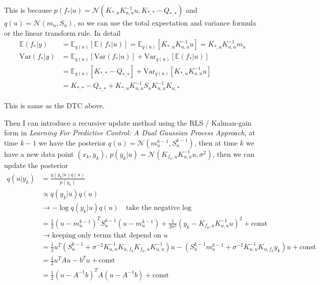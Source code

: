 \documentclass[10pt]{elegantbook}
\begin{document}
This is because $p(f_* | u) = \mathcal N (K_{*, u} K_{u, u}^{-1} u, K_{*, *} - Q_{*, *})$ and $q(u) = \mathcal N(m_u, S_u)$, so we can use the total expectation and variance formula or the linear transform rule.
In detail
\[
\begin{aligned}
    \mathbb E(f_* | y) &= \mathbb E_{q(u)} [\mathbb E(f_* | u)] = \mathbb E_{q(u)} [K_{*, u} K_{u, u}^{-1} u] = K_{*, u} K_{u, u}^{-1} m_u \\
    \text{Var}(f_* | y) &= \mathbb E_{q(u)} [\text{Var}(f_* | u)] + \text{Var}_{q(u)} [\mathbb E(f_* | u)] \\
    &= \mathbb E_{q(u)} [K_{*, *} - Q_{*, *}] + \text{Var}_{q(u)} [K_{*, u} K_{u, u}^{-1} u] \\
    &= K_{*, *} - Q_{*, *} + K_{*, u} K_{u, u}^{-1} S_u K_{u, u}^{-1} K_{u, *}
\end{aligned}
\]

This is same as the DTC above.

Then I can introduce a recursive update method using the RLS / Kalman-gain form in \textit{Learning For Predictive Control:
A Dual Gaussian Process Approach}, at time $k-1$ we have the posterior $q(u) = \mathcal N(m_u^{k-1}, S_u^{k-1})$, then at time $k$ we have a new data point $(x_k, y_k)$,
$p(y_k|u) = \mathcal N(K_{f_k, u} K_{u, u}^{-1} u, \sigma^2)$, then we can update the posterior
\begin{equation}
    \begin{aligned}
        q(u|y_k) &= \frac{q(y_k|u)q(u)}{p(y_k)} \\
        &\propto q(y_k|u)q(u) \\
        &\rightarrow - \log q(y_k|u)q(u) \quad \text{take the negative log} \\
        &= \frac{1}{2} (u - m_u^{k-1})^T S_u^{k-1} (u - m_u^{k-1}) + \frac{1}{2\sigma^2} (y_k - K_{f_k, u} K_{u, u}^{-1} u)^2 + \text{const} \\
        &\rightarrow \text{keeping only terms that depend on } u \\
        &= \frac{1}{2} u^T (S_u^{k-1} + \sigma^{-2} K_{u, u}^{-1} K_{u, f_k} K_{f_k, u} K_{u, u}^{-1}) u - (S_u^{k-1} m_u^{k-1} + \sigma^{-2} K_{u, u}^{-1} K_{u, f_k} y_k) u + \text{const} \\
        &= \frac{1}{2} u^T A u - b^T u + \text{const} \\
        &= \frac{1}{2} (u - A^{-1} b)^T A (u - A^{-1} b) + \text{const}
    \end{aligned}
\end{equation}
\end{document}
